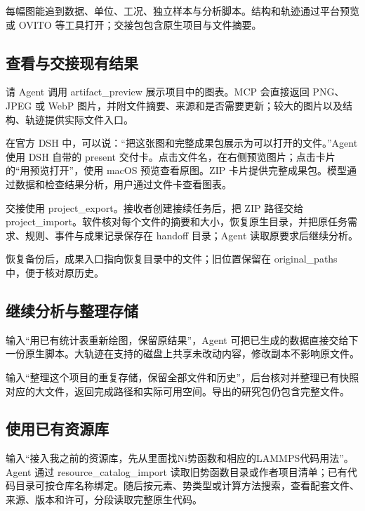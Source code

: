 \documentclass[11pt,a4paper]{ctexart}
\begin{document}
每幅图能追到数据、单位、工况、独立样本与分析脚本。结构和轨迹通过平台预览或 OVITO 等工具打开；交接包包含原生项目与文件摘要。



\subsection{查看与交接现有结果}


请 Agent 调用 artifact\_\allowbreak{}preview 展示项目中的图表。MCP 会直接返回 PNG、JPEG 或 WebP 图片，并附文件摘要、来源和是否需要更新；较大的图片以及结构、轨迹提供实际文件入口。



在官方 DSH 中，可以说：“把这张图和完整成果包展示为可以打开的文件。”Agent 使用 DSH 自带的 present 交付卡。点击文件名，在右侧预览图片；点击卡片的“用预览打开”，使用 macOS 预览查看原图。ZIP 卡片提供完整成果包。模型通过数据和检查结果分析，用户通过文件卡查看图表。



交接使用 project\_\allowbreak{}export。接收者创建接续任务后，把 ZIP 路径交给 project\_\allowbreak{}import。软件核对每个文件的摘要和大小，恢复原生目录，并把原任务需求、规则、事件与成果记录保存在 handoff 目录；Agent 读取原要求后继续分析。



恢复备份后，成果入口指向恢复目录中的文件；旧位置保留在 original\_\allowbreak{}paths 中，便于核对原历史。



\subsection{继续分析与整理存储}


输入“用已有统计表重新绘图，保留原结果”，Agent 可把已生成的数据直接交给下一份原生脚本。大轨迹在支持的磁盘上共享未改动内容，修改副本不影响原文件。



输入“整理这个项目的重复存储，保留全部文件和历史”，后台核对并整理已有快照对应的大文件，返回完成路径和实际可用空间。导出的研究包仍包含完整文件。





\subsection{使用已有资源库}


输入“接入我之前的资源库，先从里面找Ni势函数和相应的LAMMPS代码用法”。Agent 通过 resource\_\allowbreak{}catalog\_\allowbreak{}import 读取旧势函数目录或作者项目清单；已有代码目录可按仓库名称绑定。随后按元素、势类型或计算方法搜索，查看配套文件、来源、版本和许可，分段读取完整原生代码。
\end{document}
